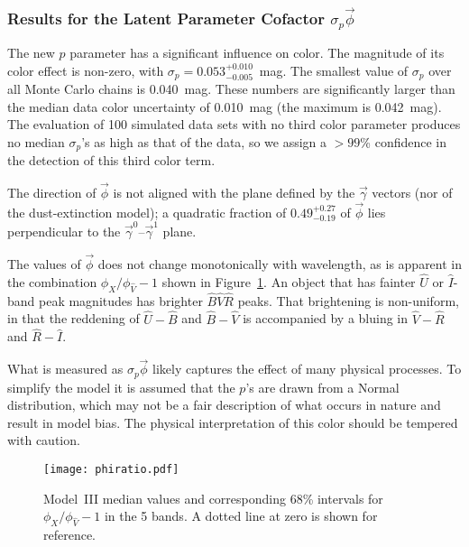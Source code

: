 \documentclass[trackchanges]{aastex62}   	%
\begin{document}
\subsubsection{Results for the Latent Parameter Cofactor $\sigma_p \vec{\phi}$}

The  new  $p$ parameter has a significant influence on color.  The magnitude of its color effect is non-zero,
with $\sigma_p = 0.053^{+ 0.010}_{-0.005}$~mag.  The smallest value of $\sigma_p$ %
over all Monte Carlo chains is 0.040~mag.
These numbers are significantly larger than the median data color uncertainty of 0.010~mag (the maximum is 0.042~mag).
The evaluation of 100 simulated data sets with no third color parameter produces no median $\sigma_p$'s  as
high as that of the data, so we assign a $>99$\% confidence in the detection of this third color term.

The direction of $\vec{\phi}$ is not aligned with the plane defined by
the $\vec{\gamma}$ vectors (nor of the   dust-extinction model); a quadratic fraction of
$0.49^{+0.27}_{-0.19}$ of  $\vec{\phi}$ lies perpendicular to the $\vec{\gamma}^0$--$\vec{\gamma}^1$ plane.

The values of $\vec{\phi}$ does not change  monotonically with wavelength, as is apparent  in 
the combination $\phi_X/\phi_{\hat{V}}-1$ shown in Figure~\ref{phiratio:fig}.  An object that has fainter  $\hat{U}$ or $\hat{I}$-band peak magnitudes
has brighter  $\hat{B}$$\hat{V}$$\hat{R}$  peaks.  That brightening is non-uniform, in that
the reddening of $\hat{U}-\hat{B}$ and $\hat{B}-\hat{V}$ is accompanied
by a bluing in $\hat{V}-\hat{R}$ and  $\hat{R}-\hat{I}$. 

What is measured as $\sigma_p \vec{\phi}$ likely captures the effect of many physical processes.
To simplify the model it is assumed that the $p$'s are drawn from a Normal distribution, which may not be a fair description of what occurs in nature
and result in model bias.
The physical interpretation of this color should be tempered with caution.

\begin{figure}[htbp] %
   \centering
      \texttt{[image: phiratio.pdf]}
   \caption{Model~III median values  and corresponding 68\% intervals for $\phi_X/\phi_{\hat{V}}-1$ in the 5 bands.
   A dotted line at zero is shown for reference.
   \label{phiratio:fig}}
\end{figure}
\end{document}
